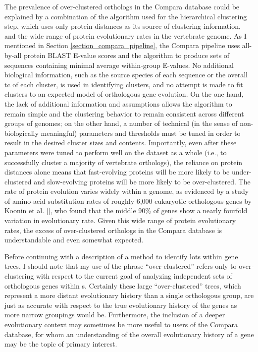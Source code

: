 The prevalence of over-clustered \euth orthologs in the Compara
database could be explained by a combination of the \hclust algorithm
used for the hierarchical clustering step, which uses only protein
distances as its source of clustering information, and the wide range
of protein evolutionary rates in the vertebrate genome. As I mentioned
in Section \ref{section_compara_pipeline}, the Compara pipeline uses
all-by-all protein BLAST E-value scores and the \hclust algorithm to
produce sets of sequences containing minimal average within-group
E-values. No additional biological information, such as the source
species of each sequence or the overall \ac{tc} of each cluster, is
used in identifying clusters, and no attempt is made to fit clusters
to an expected model of orthologous gene evolution. On the one hand,
the lack of additional information and assumptions allows the
algorithm to remain simple and the clustering behavior to remain
consistent across different groups of genomes; on the other hand, a
number of technical (in the sense of non-biologically meaningful)
parameters and thresholds must be tuned in order to result in the
desired cluster sizes and contents. Importantly, even after these
parameters were tuned to perform well on the dataset as a whole (i.e.,
to successfully cluster a majority of vertebrate orthologs), the
reliance on protein distances alone means that fast-evolving proteins
will be more likely to be under-clustered and slow-evolving proteins
will be more likely to be over-clustered. The rate of protein
evolution varies widely within a genome, as evidenced by a study of
amino-acid substitution rates of roughly 6,000 eukaryotic orthologous
genes by Koonin et al. [\citealt{Koonin2004}], who found that the
middle 90\% of genes show a nearly fourfold variation in evolutionary
rate. Given this wide range of protein evolutionary rates, the excess
of over-clustered orthologs in the Compara database is understandable
and even somewhat expected.

Before continuing with a description of a method to identify \acp{lot}
within \cmp gene trees, I should note that my use of the phrase
``over-clustered'' refers only to over-clustering with respect to the
current goal of analyzing independent sets of orthologous genes within
\mamml{}s. Certainly these large ``over-clustered'' trees, which
represent a more distant evolutionary history than a single \mammln
orthologous group, are just as accurate with respect to the true
evolutionary history of the genes as more narrow groupings would
be. Furthermore, the inclusion of a deeper evolutionary context may
sometimes be more useful to users of the Compara database, for whom an
understanding of the overall evolutionary history of a gene may be the
topic of primary interest.

